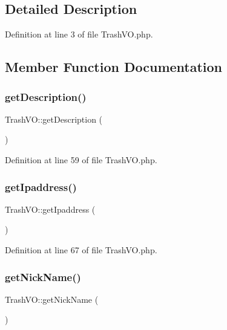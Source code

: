 \subsection{Detailed Description}


Definition at line 3 of file Trash\+V\+O.\+php.



\subsection{Member Function Documentation}
\mbox{\label{classTrashVO_a6b1202c6bed558f3775f8b7a1d9e6a03}} 
\subsubsection{\texorpdfstring{get\+Description()}{getDescription()}}
{\footnotesize\ttfamily Trash\+V\+O\+::get\+Description (\begin{DoxyParamCaption}{ }\end{DoxyParamCaption})}



Definition at line 59 of file Trash\+V\+O.\+php.

\mbox{\label{classTrashVO_ae5c46d914e022d5fe7d4dde9b6d4f7b1}} 
\subsubsection{\texorpdfstring{get\+Ipaddress()}{getIpaddress()}}
{\footnotesize\ttfamily Trash\+V\+O\+::get\+Ipaddress (\begin{DoxyParamCaption}{ }\end{DoxyParamCaption})}



Definition at line 67 of file Trash\+V\+O.\+php.

\mbox{\label{classTrashVO_aba10424cba71a92cca060b6683f4f3af}} 
\subsubsection{\texorpdfstring{get\+Nick\+Name()}{getNickName()}}
{\footnotesize\ttfamily Trash\+V\+O\+::get\+Nick\+Name (\begin{DoxyParamCaption}{ }\end{DoxyParamCaption})}



